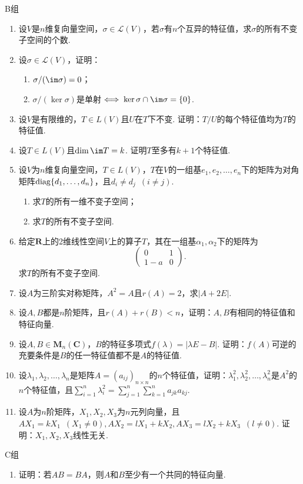 \centerline{\heiti B组}
\begin{enumerate}
    \item 设$V$是$n$维复向量空间，$\sigma\in \mathcal{L}(V)$，若$\sigma$有$n$个互异的特征值，求$\sigma$的所有不变子空间的个数.

    \item 设$\sigma\in \mathcal{L}(V)$，证明：
          \begin{enumerate}
              \item $\sigma/(\im \sigma)=0$；

              \item $\sigma/(\ker \sigma)$是单射$\iff \ker \sigma\cap\im \sigma=\{0\}$.
          \end{enumerate}

    \item 设$V$是有限维的，$T\in L(V)$且$U$在$T$下不变. 证明：$T/U$的每个特征值均为$T$的特征值.

    \item 设$T\in L(V)$且$\dim\im T=k$. 证明$T$至多有$k+1$个特征值.

    \item 设$V$为$n$维复向量空间，$T\in L(V)$，$T$在$V$的一组基$e_1,e_2,\ldots,e_n$下的矩阵为对角矩阵$\operatorname{diag}\{d_1,\ldots,d_n\}$，且$d_i\neq d_j\enspace(i\neq j)$.
          \begin{enumerate}
              \item 求$T$的所有一维不变子空间；

              \item 求$T$的所有不变子空间.
          \end{enumerate}

    \item 给定$\mathbf{R}$上的2维线性空间$V$上的算子$T$，其在一组基$\alpha_1,\alpha_2$下的矩阵为
          \[\begin{pmatrix}
                  0 & 1 \\ 1-a & 0
              \end{pmatrix}.\]
          求$T$的所有不变子空间.

    \item 设$A$为三阶实对称矩阵，$A^2=A$且$r(A)=2$，求$|A+2E|$.

    \item 设$A,B$都是$n$阶矩阵，且$r(A)+r(B)<n$，证明：$A,B$有相同的特征值和特征向量.

    \item 设$A,B\in \mathbf{M}_n(\mathbf{C})$，$B$的特征多项式$f(\lambda)=|\lambda E-B|$. 证明：$f(A)$可逆的充要条件是$B$的任一特征值都不是$A$的特征值.

    \item 设$\lambda_1,\lambda_2,\ldots,\lambda_n$是矩阵$A=(a_{ij})_{n\times n}$的$n$个特征值，证明：$\lambda_1^2,\lambda_2^2,\ldots,\lambda_n^2$是$A^2$的$n$个特征值，且$\displaystyle\sum_{i=1}^{n}\lambda_i^2=\displaystyle\sum_{j=1}^{n}\displaystyle\sum_{k=1}^{n}a_{jk}a_{kj}$.

    \item 设$A$为$n$阶矩阵，$X_1,X_2,X_3$为$n$元列向量，且$AX_1=kX_1\enspace(X_1\neq 0),AX_2=lX_1+kX_2,AX_3=lX_2+kX_3\enspace(l\neq 0)$. 证明：$X_1,X_2,X_3$线性无关.
\end{enumerate}

\centerline{\heiti C组}
\begin{enumerate}
    \item 证明：若$AB=BA$，则$A$和$B$至少有一个共同的特征向量.
\end{enumerate}
